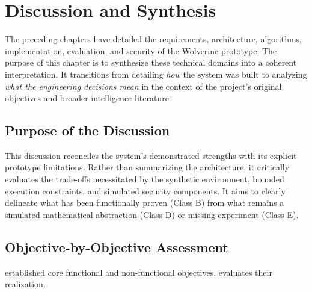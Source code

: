 \chapter{Discussion and Synthesis}
\label{ch:discussion}

The preceding chapters have detailed the requirements, architecture, algorithms, implementation, evaluation, and security of the Wolverine prototype. The purpose of this chapter is to synthesize these technical domains into a coherent interpretation. It transitions from detailing \textit{how} the system was built to analyzing \textit{what the engineering decisions mean} in the context of the project's original objectives and broader intelligence literature. 

\section{Purpose of the Discussion}
\label{sec:disc-purpose}
This discussion reconciles the system's demonstrated strengths with its explicit prototype limitations. Rather than summarizing the architecture, it critically evaluates the trade-offs necessitated by the synthetic environment, bounded execution constraints, and simulated security components. It aims to clearly delineate what has been functionally proven (Class B) from what remains a simulated mathematical abstraction (Class D) or missing experiment (Class E).

\section{Objective-by-Objective Assessment}
\label{sec:disc-objectives}
 established core functional and non-functional objectives.  evaluates their realization.


